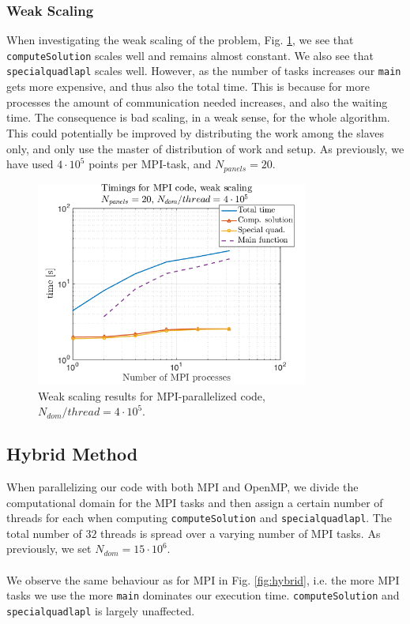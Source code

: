 \documentclass[a4paper,10pt]{article}
\def\code#1{\texttt{#1}}
\begin{document}
\subsubsection*{Weak Scaling}
When investigating the weak scaling of the problem, Fig. \ref{fig:mpi_weaktime}, we see that \code{computeSolution} scales well and remains almost constant. We also see that \code{specialquadlapl} scales well. However, as the number of tasks increases our \code{main} gets more expensive, and thus also the total time. This is because for more processes the amount of communication needed increases, and also the waiting time. The consequence is bad scaling, in a weak sense, for the whole algorithm. This could potentially be improved by distributing the work among the slaves only, and only use the master of distribution of work and setup. As previously, we have used $4\cdot 10^5$ points per MPI-task, and $N_{panels}=20$.
\begin{figure}[ht]
    \begin{center}
        \includegraphics[width=0.8\textwidth]{Graphics/craypat_mpi_weakscaling.png}
    \end{center}
    \caption{Weak scaling results for MPI-parallelized code, $N_{dom}/thread=4\cdot 10^5$.}
    \label{fig:mpi_weaktime}
\end{figure}


\FloatBarrier

\subsection*{Hybrid Method}
When parallelizing our code with both MPI and OpenMP, we divide the computational domain for the MPI tasks and then assign a certain number of threads for each when computing \code{computeSolution} and \code{specialquadlapl}. The total number of $32$ threads is spread over a varying number of MPI tasks. As previously, we set $N_{dom}=15\cdot10^6$. 
\\ \\
We observe the same behaviour as for MPI in Fig. \ref{fig:hybrid}, i.e. the more MPI tasks we use the more \code{main} dominates our execution time. \code{computeSolution} and \code{specialquadlapl} is largely unaffected.  
\end{document}
